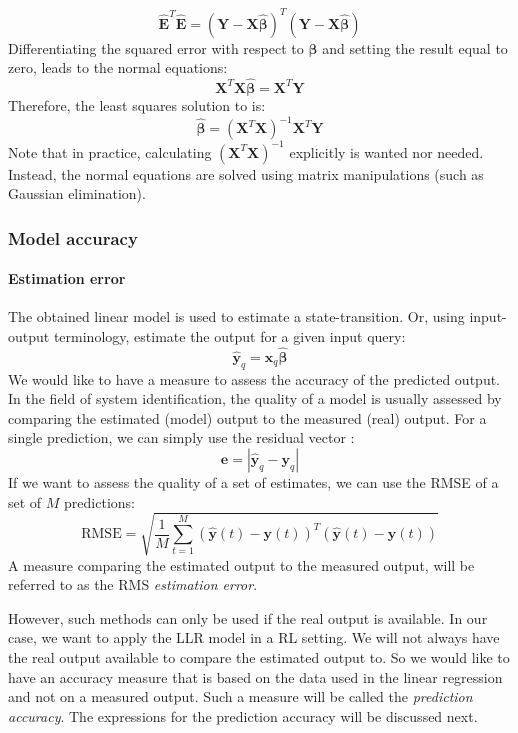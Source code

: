 $$
	\hat{\bm{E}}^T\hat{\bm{E}} = \left(\bm{Y}-\bm{X}\hat{\bm{\beta}}\right)^T\left(\bm{Y}-\bm{X}\hat{\bm{\beta}}\right)
$$ 
Differentiating the squared error with respect to $\bm{\beta}$ and setting the result equal to zero, leads to the normal equations:
$$
	\bm{X}^T\bm{X}\hat{\bm{\beta}} = \bm{X}^T\mathbf{Y}
$$
Therefore, the least squares solution to  is:
$$
	\bm{\hat{\beta}} = \left(\bm{X}^T\bm{X}\right)^{-1}\bm{X}^T\bm{Y}
$$
Note that in practice, calculating $\left(\bm{X}^T\bm{X}\right)^{-1}$ explicitly is wanted nor needed. Instead, the normal equations are solved using matrix manipulations (such as Gaussian elimination).

\subsubsection{Model accuracy}\label{sec:LLR-model accuracy}
\paragraph{Estimation error}\label{sec:LLR-estimation error} The obtained linear model is used to estimate a state-transition. Or, using input-output terminology, estimate the output for a given input query:
$$
	\mathbf{\hat{y}}_q = \mathbf{x}_q \bm{\hat{\beta}}
$$
We would like to have a measure to assess the accuracy of the predicted output. In the field of system identification, the quality of a model is usually assessed by comparing the estimated (model) output to the measured (real) output. For a single prediction, we can simply use the residual vector :
$$
	\mathbf{e} = \left| \mathbf{\hat{y}}_q - \mathbf{y}_q \right| 
$$ 
If we want to assess the quality of a set of estimates, we can use the \ac{RMSE} of a set of $M$ predictions:
$$
	\textrm{RMSE} = \sqrt{ \frac{1}{M} \sum_{t=1}^{M}{\left(\mathbf{\hat{y}}(t) - \mathbf{y}(t) \right)^T \left(\mathbf{\hat{y}}(t) - \mathbf{y}(t) \right) }}
$$
A measure comparing the estimated output to the measured output, will be referred to as the \ac{RMS} \emph{estimation error}. 

However, such methods can only be used if the real output is available. In our case, we want to apply the \ac{LLR} model in a \ac{RL} setting. We will not always have the real output available to compare the estimated output to. So we would like to have an accuracy measure that is based on the data used in the linear regression and not on a measured output. Such a measure will be called the \emph{prediction accuracy}. The expressions for the prediction accuracy will be discussed next.

